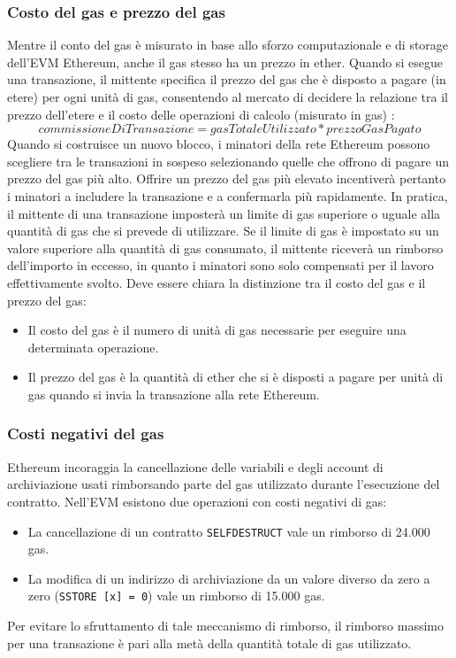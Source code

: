 \subsubsection{Costo del gas e prezzo del gas}
Mentre il conto del gas è misurato in base allo sforzo computazionale e di storage dell'EVM Ethereum, anche il gas stesso ha un prezzo in ether. Quando si esegue una transazione, il mittente specifica il prezzo del gas che è disposto a pagare (in etere) per ogni unità di gas, consentendo al mercato di decidere la relazione tra il prezzo dell'etere e il costo delle operazioni di calcolo (misurato in gas) :
%
\[ commissione Di Transazione = gas Totale Utilizzato * prezzo Gas Pagato \]
%
Quando si costruisce un nuovo blocco, i minatori della rete Ethereum possono scegliere tra le transazioni in sospeso selezionando quelle che offrono di pagare un prezzo del gas più alto. Offrire un prezzo del gas più elevato incentiverà pertanto i minatori a includere la transazione e a confermarla più rapidamente. In pratica, il mittente di una transazione imposterà un limite di gas superiore o uguale alla quantità di gas che si prevede di utilizzare. Se il limite di gas è impostato su un valore superiore alla quantità di gas consumato, il mittente riceverà un rimborso dell'importo in eccesso, in quanto i minatori sono solo compensati per il lavoro effettivamente svolto. Deve essere chiara la distinzione tra il costo del gas e il prezzo del gas:
\begin{itemize}
	\item Il costo del gas è il numero di unità di gas necessarie per eseguire una determinata operazione.
	\item Il prezzo del gas è la quantità di ether che si è disposti a pagare per unità di gas quando si invia la transazione alla rete Ethereum.
\end{itemize}

\subsubsection{Costi negativi del gas}
Ethereum incoraggia la cancellazione delle variabili e degli account di archiviazione usati rimborsando parte del gas utilizzato durante l'esecuzione del contratto. Nell'EVM esistono due operazioni con costi negativi di gas:
\begin{itemize}
	\item La cancellazione di un contratto \lstinline|SELFDESTRUCT| vale un rimborso di 24.000 gas.
	\item La modifica di un indirizzo di archiviazione da un valore diverso da zero a zero (\lstinline|SSTORE [x] = 0|) vale un rimborso di 15.000 gas.
\end{itemize}
Per evitare lo sfruttamento di tale meccanismo di rimborso, il rimborso massimo per una transazione è pari alla metà della quantità totale di gas utilizzato.

